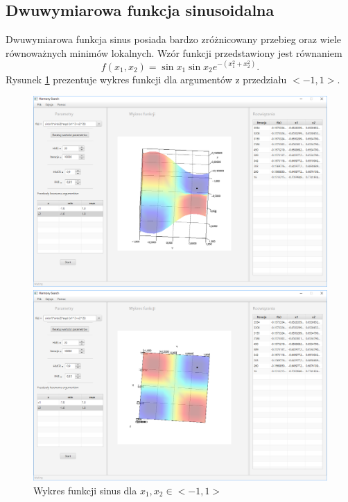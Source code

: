 \documentclass[10pt, a4paper]{article}
\begin{document}
\subsection{Dwuwymiarowa funkcja sinusoidalna}
\label{subsec:sin}
Dwuwymiarowa funkcja sinus posiada bardzo zróżnicowany przebieg oraz wiele równoważnych minimów lokalnych. Wzór funkcji przedstawiony jest równaniem $$f(x_{1},x_{2})=\sin{x_{1}}\sin{x_{2}}e^{-(x_{1}^2+x_{2}^2)}.$$ Rysunek \ref{fig:8} prezentuje wykres funkcji dla argumentów z przedziału $<-1,1>$.
\begin{figure}[htbp] 
	\begin{minipage}[b]{.5\textwidth}
		\centering
		\includegraphics[width=\linewidth]{images/81.PNG}
	\end{minipage} 
	\begin{minipage}[b]{.5\textwidth}
		\centering
		\includegraphics[width=\linewidth]{images/82.PNG} 
	\end{minipage}
	\label{fig:8}
	\caption{Wykres funkcji sinus dla $x_{1}, x_{2} \in <-1,1>$}
\end{figure}
\end{document}
